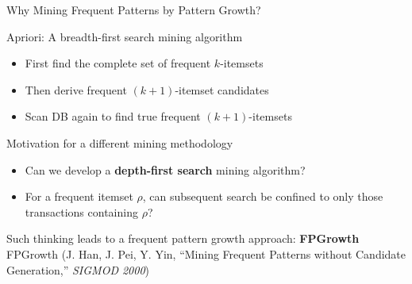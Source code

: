\documentclass[aspectratio=169, 11pt]{beamer}
\begin{document}
\begin{frame}{Why Mining Frequent Patterns by Pattern Growth?}
    \begin{block}{Apriori: A breadth-first search mining algorithm}
        \begin{itemize}
            \item First find the complete set of frequent $k$-itemsets
            \item Then derive frequent $(k+1)$-itemset candidates
            \item Scan DB again to find true frequent $(k+1)$-itemsets
        \end{itemize}
    \end{block}
    \vspace{0.2cm}
    \begin{block}{Motivation for a different mining methodology}
        \begin{itemize}
            \item Can we develop a \textbf{depth-first search} mining algorithm?
            \item For a frequent itemset $\rho$, can subsequent search be confined to only those transactions containing $\rho$?
        \end{itemize}
    \end{block}
    \vspace{0.2cm}
    \begin{alertblock}{Such thinking leads to a frequent pattern growth approach: \textbf{FPGrowth}}
        \footnotesize FPGrowth (J. Han, J. Pei, Y. Yin, ``Mining Frequent Patterns without Candidate Generation,'' \textit{SIGMOD 2000})
    \end{alertblock}
\end{frame}
\end{document}
